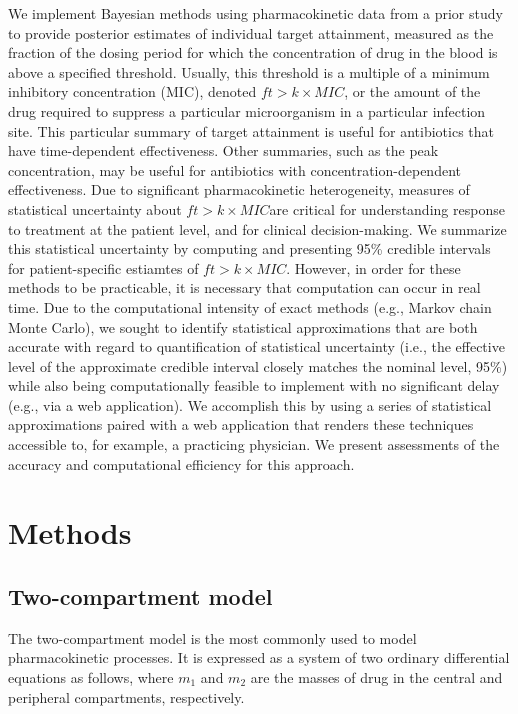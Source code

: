 \documentclass{article}\usepackage[]{graphicx}\usepackage[]{color}
\newcommand{\mic}{$ft > k \times MIC$}
\begin{document}
We implement Bayesian methods using pharmacokinetic data from a prior study to provide posterior estimates of individual target attainment, measured as the fraction of the dosing period for which the concentration of drug in the blood is above a specified threshold. Usually, this threshold is a multiple of a minimum inhibitory concentration (MIC), denoted \mic, or the amount of the drug required to suppress a particular microorganism in a particular infection site. This particular summary of target attainment is useful for antibiotics that have time-dependent effectiveness. Other summaries, such as the peak concentration, may be useful for antibiotics with concentration-dependent effectiveness. Due to significant pharmacokinetic heterogeneity, measures of statistical uncertainty about \mic are critical for understanding response to treatment at the patient level, and for clinical decision-making. We summarize this statistical uncertainty by computing and presenting 95\% credible intervals for patient-specific estiamtes of \mic. However, in order for these methods to be practicable, it is necessary that computation can occur in real time. Due to the computational intensity of exact methods (e.g., Markov chain Monte Carlo), we sought to identify statistical approximations that are both accurate with regard to quantification of statistical uncertainty (i.e., the effective level of the approximate credible interval closely matches the nominal level, 95\%) while also being computationally feasible to implement with no significant delay (e.g., via a web application). We accomplish this by using a series of statistical approximations paired with a web application that renders these techniques accessible to, for example, a practicing physician. We present assessments of the accuracy and computational efficiency for this approach.




\section{Methods}
\subsection{Two-compartment model}
The two-compartment model is the most commonly used to model pharmacokinetic processes. It is expressed as a system of two ordinary differential equations as follows, where $m_1$ and $m_2$ are the masses of drug in the central and peripheral compartments, respectively.
\end{document}
